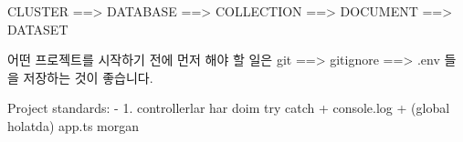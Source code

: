 

CLUSTER ==> DATABASE ==>  COLLECTION ==> DOCUMENT ==> DATASET

어떤 프로젝트를 시작하기 전에 먼저 해야 할 일은 git ==> gitignore ==> .env 들을 저장하는 것이 좋습니다.


Project standards:
- 1. controllerlar har doim try catch + console.log + (global holatda) app.ts morgan
